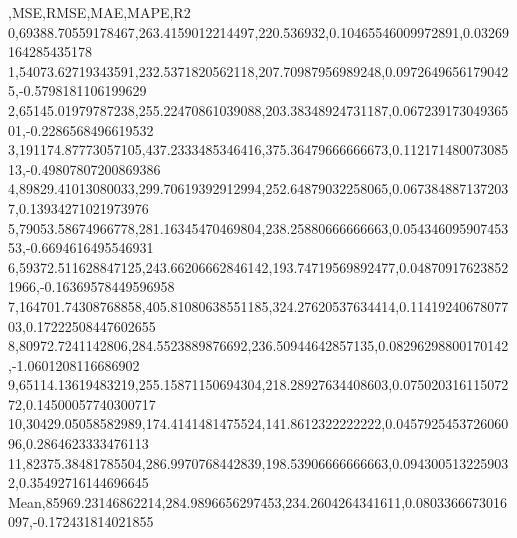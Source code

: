 ,MSE,RMSE,MAE,MAPE,R2
0,69388.70559178467,263.4159012214497,220.536932,0.10465546009972891,0.03269164285435178
1,54073.62719343591,232.5371820562118,207.70987956989248,0.09726496561790425,-0.5798181106199629
2,65145.01979787238,255.22470861039088,203.38348924731187,0.06723917304936501,-0.2286568496619532
3,191174.87773057105,437.2333485346416,375.36479666666673,0.11217148007308513,-0.49807807200869386
4,89829.41013080033,299.70619392912994,252.64879032258065,0.0673848871372037,0.13934271021973976
5,79053.58674966778,281.16345470469804,238.25880666666663,0.05434609590745353,-0.6694616495546931
6,59372.511628847125,243.66206662846142,193.74719569892477,0.048709176238521966,-0.16369578449596958
7,164701.74308768858,405.81080638551185,324.27620537634414,0.1141924067807703,0.17222508447602655
8,80972.7241142806,284.5523889876692,236.50944642857135,0.08296298800170142,-1.0601208116686902
9,65114.13619483219,255.15871150694304,218.28927634408603,0.07502031611507272,0.14500057740300717
10,30429.05058582989,174.4141481475524,141.8612322222222,0.045792545372606096,0.2864623333476113
11,82375.38481785504,286.9970768442839,198.53906666666663,0.0943005132259032,0.35492716144696645
Mean,85969.23146862214,284.9896656297453,234.2604264341611,0.0803366673016097,-0.172431814021855
